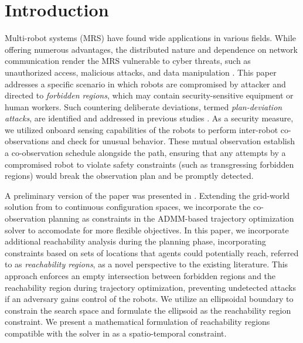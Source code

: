 \documentclass[10pt,twocolumn,twoside]{IEEEtran}
\begin{document}
\section{Introduction}\label{sec:introduction}
Multi-robot systems (MRS) have found wide applications in various fields. While offering numerous advantages, the distributed nature and dependence on network communication render the MRS vulnerable to cyber threats, such as unauthorized access, malicious attacks, and data manipulation \cite{brunner2010infiltrating}. This paper addresses a specific scenario in which  robots are compromised by attacker and directed to \emph{forbidden regions}, which may contain security-sensitive equipment or human workers. Such countering deliberate deviations, termed \emph{plan-deviation attacks}, are identified and addressed in previous studies \cite{wardega2019resilience, wardega2023byzantine, wardega2023hola, yang2021multi, yang2020multi}. As a security measure, we utilized onboard sensing capabilities of the robots to perform inter-robot co-observations and check for unusual behavior. These mutual observation establish a co-observation schedule alongside the path, ensuring that any attempts by a compromised robot to violate safety constraints (such as transgressing forbidden regions) would break the observation plan and be promptly detected.

A preliminary version of the paper was presented in \cite{yang2020multi,yang2021multi}. Extending the grid-world solution from \cite{wardega2019resilience} to continuous configuration spaces, we incorporate the co-observation planning as constraints in the ADMM-based trajectory optimization solver to accomodate for more flexible objectives. In this paper, we incorporate additional reachability analysis during the planning phase, incorporating constraints based on sets of locations that agents could potentially reach, referred to as \emph{reachability regions}, as a novel perspective to the existing literature. This approach enforces an empty intersection between forbidden regions and the reachability region during trajectory optimization, preventing undetected attacks if an adversary gains control of the robots. We utilize an ellipsoidal boundary to constrain the search space and formulate the ellipsoid as the reachability region constraint. We present a mathematical formulation of reachability regions compatible with the solver in \cite{yang2020multi} as a spatio-temporal constraint. 
\end{document}
